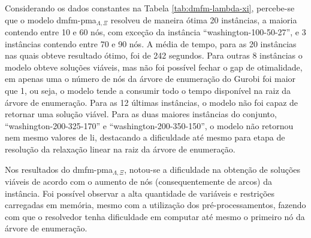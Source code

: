 Considerando os dados constantes  na Tabela \ref{tab:dmfm-lambda-xi}, percebe-se
que  o  modelo \gls{dmfm-pma}$_{\Lambda,  \Xi}$  resolveu  de maneira  ótima  20
instâncias,  a maioria  contendo entre  10 e  60 nós,  com exceção  da instância
``washington-100-50-27'', e 3 instâncias contendo entre  70 e 90 nós. A média de
tempo,  para as  20 instâncias  nas  quais obteve  resultado ótimo,  foi de  242
segundos. Para outras 8 instâncias o modelo obteve soluções viáveis, mas não foi
possível fechar o gap de otimalidade, em apenas uma o número de nós da árvore de
enumeração do Gurobi foi maior que 1, ou  seja, o modelo tende a consumir todo o
tempo disponível na raiz da árvore de enumeração. Para as 12 últimas instâncias,
o modelo  não foi  capaz de retornar  uma solução viável.  Para as  duas maiores
instâncias do conjunto, ``washington-200-325-170'' e ``washington-200-350-150'',
o modelo  não retornou nem mesmo  valores de \gls{li}, destacando  a dificuldade
até mesmo  para etapa  de resolução  da relaxação  linear na  raiz da  árvore de
enumeração.

Nos  resultados do  \gls{dmfm-pma}$_{\Lambda, \Xi}$,  notou-se a  dificuldade na
obtenção de soluções viáveis de acordo com o aumento de nós (consequentemente de
arcos) da  instância. Foi  possível observar  a alta  quantidade de  variáveis e
restrições carregadas em memória, mesmo com a utilização dos pré-processamentos,
fazendo com que o resolvedor tenha  dificuldade em computar até mesmo o primeiro
nó da árvore de enumeração.

